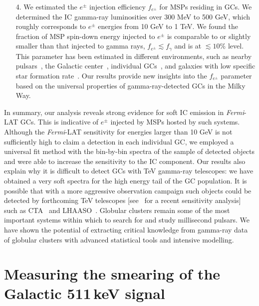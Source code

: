 \documentclass[doublespace,nopageskip]{VTthesis} %
\begin{document}
\begin{itemize}
    \item[4.] We estimated the $e^\pm$ injection efficiency $f_{e^\pm}$ for MSPs residing in GCs. We determined the IC gamma-ray luminosities over 300 MeV to 500 GeV, which roughly corresponds to $e^\pm$ energies from 10 GeV to 1 TeV. We found the fraction of MSP spin-down energy injected to $e^\pm$ is comparable to or slightly smaller than that injected to gamma rays, $f_{e^\pm} \lesssim f_\gamma$ and is at $\lesssim 10\%$ level. This parameter has been estimated in different environments, such as {nearby pulsars~\citep{2017PhRvD..96j3013H, 2018PhRvD..98d3005H, 2021arXiv210400014H}}, the Galactic center~\citep{2013MNRAS.435L..14B}, individual GCs~\citep{2019MNRAS.484.2876M}, and galaxies with low specific star formation rate~\citep{2020arXiv200508982S}. Our results provide new insights into the $f_{e^\pm}$ parameter based on the universal properties of gamma-ray-detected GCs in the Milky Way.
\end{itemize}

In summary, our analysis reveals strong evidence for {soft} IC emission in \textit{Fermi}-LAT GCs. This is indicative of $e^\pm$ injected by MSPs hosted by such systems. Although the {\it Fermi}-LAT sensitivity for energies larger than 10 GeV is not sufficiently high to claim a detection in each individual GC, we employed a universal fit method with the bin-by-bin spectra of the sample of detected objects and were able to increase the sensitivity to the IC component. Our results also explain why it is difficult to detect GCs with TeV gamma-ray telescopes: we have obtained a very soft spectra for the high energy tail of the GC population. It is possible that with a more aggressive observation campaign such objects could be detected by forthcoming TeV telescopes [see~\citep{2018MNRAS.473..897N} for a recent sensitivity analysis] such as CTA~\citep{2019scta.book.....C} and LHAASO~\citep{2019arXiv190502773B}. Globular clusters remain some of the most important systems within which to search for and study millisecond pulsars. We have shown the potential of extracting critical knowledge from gamma-ray data of globular clusters with advanced statistical tools and intensive modelling. 


\chapter{Measuring the smearing of the Galactic 511\,keV signal} \label{ch:511keV}
\end{document}
